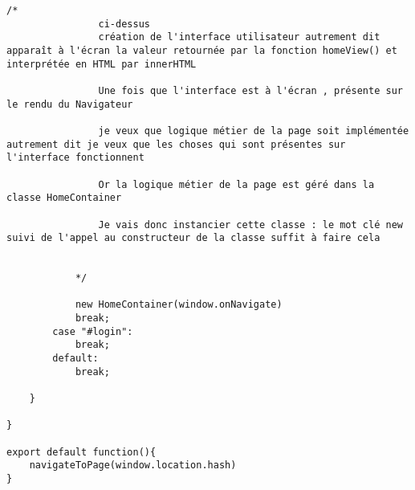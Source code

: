 \documentclass[a4paper, 12pt]{report}
\begin{document}
\begin{lstlisting}[style=mainlststyle]
            /*
                ci-dessus
                création de l'interface utilisateur autrement dit apparaît à l'écran la valeur retournée par la fonction homeView() et interprétée en HTML par innerHTML

                Une fois que l'interface est à l'écran , présente sur le rendu du Navigateur 

                je veux que logique métier de la page soit implémentée autrement dit je veux que les choses qui sont présentes sur l'interface fonctionnent

                Or la logique métier de la page est géré dans la classe HomeContainer

                Je vais donc instancier cette classe : le mot clé new suivi de l'appel au constructeur de la classe suffit à faire cela


            */

            new HomeContainer(window.onNavigate)
            break; 
        case "#login":
            break;
        default:
            break;

    }

}

export default function(){
    navigateToPage(window.location.hash)
}






\end{lstlisting}
\end{document}
